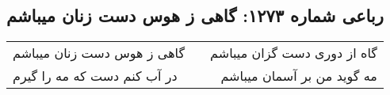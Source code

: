 \begin{center}
\section*{رباعی شماره ۱۲۷۳: گاهی ز هوس دست زنان میباشم}
\label{sec:1273}
\begin{longtable}{l p{0.5cm} r}
گاهی ز هوس دست زنان میباشم
&&
گاه از دوری دست گزان میباشم
\\
در آب کنم دست که مه را گیرم
&&
مه گوید من بر آسمان میباشم
\\
\end{longtable}
\end{center}
